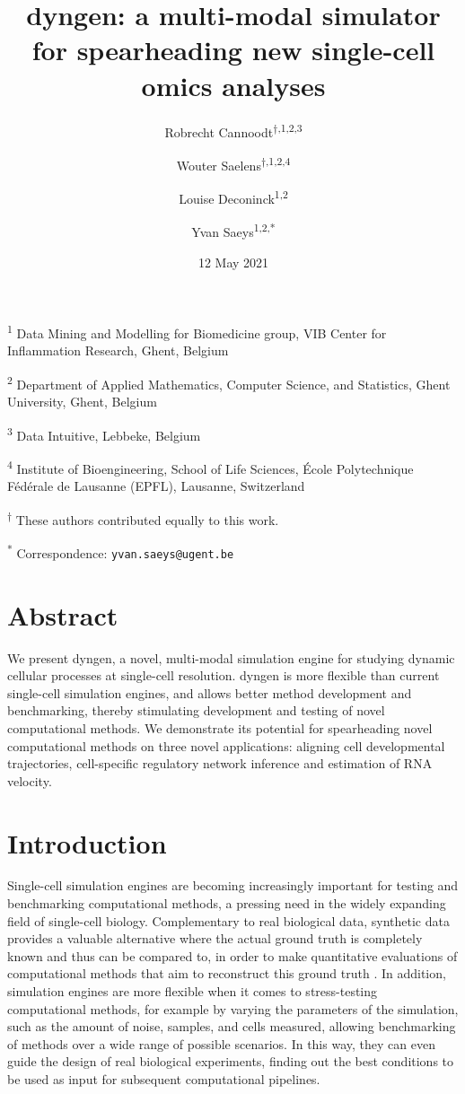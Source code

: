 \documentclass[10pt, a4paper]{article}
\title{dyngen: a multi-modal simulator for spearheading new single-cell omics analyses}
\author{Robrecht Cannoodt\textsuperscript{$\dagger{}$,1,2,3} \and Wouter Saelens\textsuperscript{$\dagger{}$,1,2,4} \and Louise Deconinck\textsuperscript{1,2} \and Yvan Saeys\textsuperscript{1,2,*}}
\date{12 May 2021}
\begin{document}
\maketitle

\textsuperscript{1} Data Mining and Modelling for Biomedicine group, VIB
Center for Inflammation Research, Ghent, Belgium

\textsuperscript{2} Department of Applied Mathematics, Computer Science,
and Statistics, Ghent University, Ghent, Belgium

\textsuperscript{3} Data Intuitive, Lebbeke, Belgium

\textsuperscript{4} Institute of Bioengineering, School of Life
Sciences, École Polytechnique Fédérale de Lausanne (EPFL), Lausanne,
Switzerland

\textsuperscript{$\dagger{}$} These authors contributed equally to this work.

\textsuperscript{*} Correspondence: \texttt{yvan.saeys@ugent.be}

\section{Abstract}\label{abstract}

We present dyngen, a novel, multi-modal simulation engine for studying
dynamic cellular processes at single-cell resolution. dyngen is more
flexible than current single-cell simulation engines, and allows better
method development and benchmarking, thereby stimulating development and
testing of novel computational methods. We demonstrate its potential for
spearheading novel computational methods on three novel applications:
aligning cell developmental trajectories, cell-specific regulatory
network inference and estimation of RNA velocity.

\section{Introduction}\label{introduction}

Single-cell simulation engines are becoming increasingly important for
testing and benchmarking computational methods, a pressing need in the
widely expanding field of single-cell biology. Complementary to real
biological data, synthetic data provides a valuable alternative where
the actual ground truth is completely known and thus can be compared to,
in order to make quantitative evaluations of computational methods that
aim to reconstruct this ground truth
\cite{zappia_splattersimulationsinglecell_2017}. In addition,
simulation engines are more flexible when it comes to stress-testing
computational methods, for example by varying the parameters of the
simulation, such as the amount of noise, samples, and cells measured,
allowing benchmarking of methods over a wide range of possible
scenarios. In this way, they can even guide the design of real
biological experiments, finding out the best conditions to be used as
input for subsequent computational pipelines.
\end{document}
